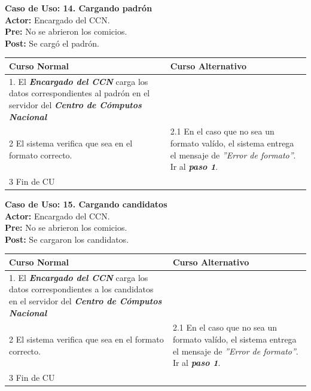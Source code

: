 \documentclass[spanish, 10pt,a4paper]{article}
\numberwithin{equation}{section} %
\begin{document}
\newpage
\noindent\textbf{Caso de Uso: 14. Cargando padrón}\\
\textbf{Actor: } Encargado del CCN.\\
\textbf{Pre: } No se abrieron los comicios.\\
\textbf{Post: } Se cargó el padrón.\\
\begin{table}[H]
  \centering
\bgroup
\def\arraystretch{1.3}
  \begin{tabular}{p{9cm} | p{7cm}}
    \hline
    Curso Normal & Curso Alternativo \\
    \hline
    \hline    
    1. El \textbf{\textit{Encargado del CCN}} carga los datos correspondientes al padrón en el servidor del \textbf{\textit{Centro de Cómputos Nacional}}
    & \\
    
    \hline
    2 El sistema verifica que sea en el formato correcto.
    & 
    2.1 En el caso que no sea un formato valído, el sistema entrega el mensaje de \textit{''Error de formato''}. Ir al \textbf{\textit{paso 1}}.
    \\
       
    \hline
    3 Fin de CU
    & \\
    \hline
  \end{tabular}
\egroup
\end{table}

\noindent\textbf{Caso de Uso: 15. Cargando candidatos}\\
\textbf{Actor: } Encargado del CCN.\\
\textbf{Pre: } No se abrieron los comicios.\\
\textbf{Post: } Se cargaron los candidatos.\\
\begin{table}[H]
  \centering
\bgroup
\def\arraystretch{1.3}
  \begin{tabular}{p{9cm} | p{7cm}}
    \hline
    Curso Normal & Curso Alternativo \\
    \hline
    \hline    
    1. El \textbf{\textit{Encargado del CCN}} carga los datos correspondientes a los candidatos en el servidor del \textbf{\textit{Centro de Cómputos Nacional}}
    & \\
    
    \hline
    2 El sistema verifica que sea en el formato correcto.
    & 
    2.1 En el caso que no sea un formato valído, el sistema entrega el mensaje de \textit{''Error de formato''}. Ir al \textbf{\textit{paso 1}}.
    \\
       
    \hline
    3 Fin de CU
    & \\
    \hline
  \end{tabular}
\egroup
\end{table}
\end{document}
